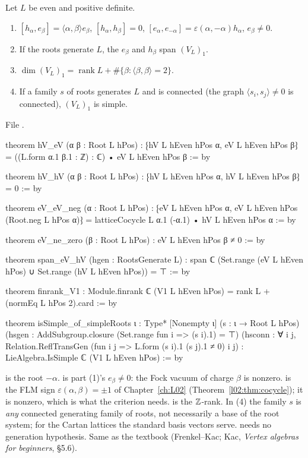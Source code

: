 \begin{theorem}\label{l23:thm:latticesimple}
Let $L$ be even and positive definite.
\begin{enumerate}
\item $[h_\alpha,e_\beta]=\langle\alpha,\beta\rangle e_\beta$, $[h_\alpha,h_\beta]=0$, $[e_\alpha,e_{-\alpha}]=\varepsilon(\alpha,-\alpha)h_\alpha$, $e_\beta\ne0$.
\item If the roots generate $L$, the $e_\beta$ and $h_\beta$ span $(V_L)_1$.
\item $\dim(V_L)_1=\operatorname{rank}L+\#\{\beta:\langle\beta,\beta\rangle=2\}$.
\item If a family $s$ of roots generates $L$ and is connected (the graph $\langle s_i,s_j\rangle\ne0$ is connected), $(V_L)_1$ is simple.
\end{enumerate}
\end{theorem}
\noindent File .
\begin{leancode}
theorem hV_eV (α β : Root L hPos) :
    ⁅hV L hEven hPos α, eV L hEven hPos β⁆ = ((L.form α.1 β.1 : ℤ) : ℂ) • eV L hEven hPos β := by

theorem hV_hV (α β : Root L hPos) : ⁅hV L hEven hPos α, hV L hEven hPos β⁆ = 0 := by

theorem eV_eV_neg (α : Root L hPos) :
    ⁅eV L hEven hPos α, eV L hEven hPos (Root.neg L hPos α)⁆
      = latticeCocycle L α.1 (-α.1) • hV L hEven hPos α := by

theorem eV_ne_zero (β : Root L hPos) : eV L hEven hPos β ≠ 0 := by

theorem span_eV_hV (hgen : RootsGenerate L) :
    span ℂ (Set.range (eV L hEven hPos) ∪ Set.range (hV L hEven hPos)) = ⊤ := by

theorem finrank_V1 : Module.finrank ℂ (V1 L hEven hPos) = rank L + (normEq L hPos 2).card := by

theorem isSimple_of_simpleRoots {ι : Type*} [Nonempty ι] (s : ι → Root L hPos)
    (hsgen : AddSubgroup.closure (Set.range fun i => (s i).1) = ⊤)
    (hsconn : ∀ i j, Relation.ReflTransGen (fun i j => L.form (s i).1 (s j).1 ≠ 0) i j) :
    LieAlgebra.IsSimple ℂ (V1 L hEven hPos) := by
\end{leancode}

\begin{dictionary}
 is the root $-\alpha$.  is part (1)'s $e_\beta\ne0$: the Fock vacuum of charge $\beta$ is
nonzero.  is the FLM sign $\varepsilon(\alpha,\beta)=\pm1$ of Chapter~\ref{ch:L02} (Theorem~\ref{l02:thm:cocycle});
it is nonzero, which is what the criterion needs.  is the ${\mathbb{Z}}$-rank. In (4) the family $s$ is \emph{any} connected
generating family of roots, not necessarily a base of the root system; for the Cartan lattices the standard basis vectors serve.
 needs no generation hypothesis. Same as the textbook (Frenkel--Kac; Kac, \emph{Vertex algebras for beginners},
\S5.6).
\end{dictionary}

